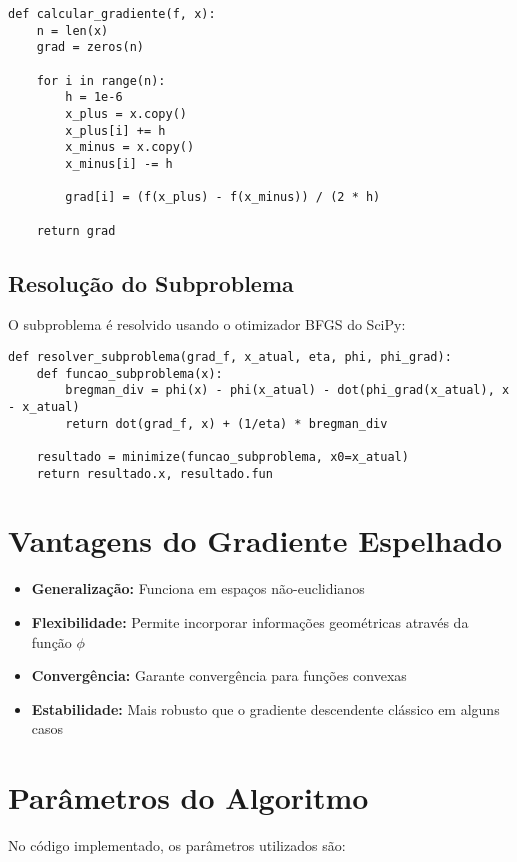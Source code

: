 \documentclass[12pt]{article}
\begin{document}
\begin{verbatim}
def calcular_gradiente(f, x):
    n = len(x)
    grad = zeros(n)
    
    for i in range(n):
        h = 1e-6
        x_plus = x.copy()
        x_plus[i] += h
        x_minus = x.copy()
        x_minus[i] -= h
        
        grad[i] = (f(x_plus) - f(x_minus)) / (2 * h)
    
    return grad
\end{verbatim}

\subsection{Resolução do Subproblema}

O subproblema é resolvido usando o otimizador BFGS do SciPy:

\begin{verbatim}
def resolver_subproblema(grad_f, x_atual, eta, phi, phi_grad):
    def funcao_subproblema(x):
        bregman_div = phi(x) - phi(x_atual) - dot(phi_grad(x_atual), x - x_atual)
        return dot(grad_f, x) + (1/eta) * bregman_div
    
    resultado = minimize(funcao_subproblema, x0=x_atual)
    return resultado.x, resultado.fun
\end{verbatim}

\section{Vantagens do Gradiente Espelhado}

\begin{itemize}
    \item \textbf{Generalização:} Funciona em espaços não-euclidianos
    \item \textbf{Flexibilidade:} Permite incorporar informações geométricas através da função $\phi$
    \item \textbf{Convergência:} Garante convergência para funções convexas
    \item \textbf{Estabilidade:} Mais robusto que o gradiente descendente clássico em alguns casos
\end{itemize}

\section{Parâmetros do Algoritmo}

No código implementado, os parâmetros utilizados são:
\end{document}
